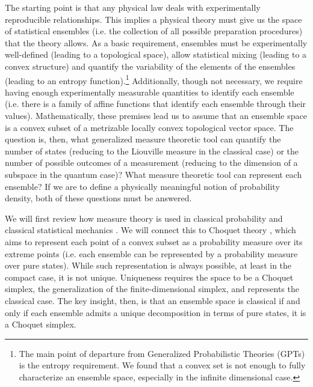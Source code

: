 \documentclass[10pt,twocolumn, nofootinbib]{revtex4-2}
\begin{document}
The starting point is that any physical law deals with experimentally reproducible relationships. This implies a physical theory must give us the space of statistical ensembles (i.e. the collection of all possible preparation procedures) that the theory allows. As a basic requirement, ensembles must be experimentally well-defined (leading to a topological space), allow statistical mixing (leading to a convex structure) and quantify the variability of the elements of the ensembles (leading to an entropy function).\footnote{The main point of departure from Generalized Probabilistic Theories (GPTs) is the entropy requirement. We found that a convex set is not enough to fully characterize an ensemble space, especially in the infinite dimensional case.} Additionally, though not necessary, we require having enough experimentally measurable quantities to identify each ensemble (i.e. there is a family of affine functions that identify each ensemble through their values). Mathematically, these premises lead us to assume that an ensemble space is a convex subset of a metrizable locally convex topological vector space. The question is, then, what generalized measure theoretic tool can quantify the number of states (reducing to the Liouville measure in the classical case) or the number of possible outcomes of a measurement (reducing to the dimension of a subspace in the quantum case)? What measure theoretic tool can represent each ensemble? If we are to define a physically meaningful notion of probability density, both of these questions must be answered.

We will first review how measure theory is used in classical probability \cite{kolmogorov2018} and classical statistical mechanics \cite{Peliti2011}. We will connect this to Choquet theory \cite{phelps2001}, which aims to represent each point of a convex subset as a probability measure over its extreme points (i.e. each ensemble can be represented by a probability measure over pure states). While such representation is always possible, at least in the compact case, it is not unique. Uniqueness requires the space to be a Choquet simplex, the generalization of the finite-dimensional simplex, and represents the classical case. The key insight, then, is that an ensemble space is classical if and only if each ensemble admits a unique decomposition in terms of pure states, it is a Choquet simplex.
\end{document}
